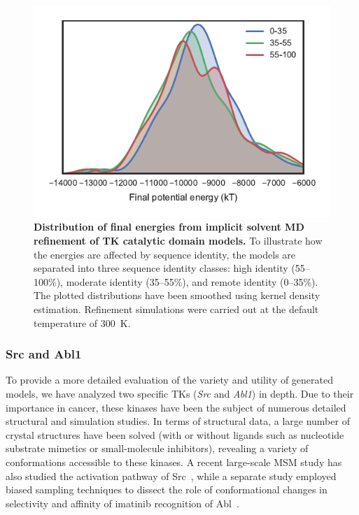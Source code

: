 \documentclass[aps,pre,twocolumn,nofootinbib,superscriptaddress,linenumbers]{revtex4-1}
\begin{document}
\begin{figure}[tbp]
    \includegraphics[width=1.0\columnwidth]{energies/energies.pdf}

    \caption{{\bf Distribution of final energies from implicit solvent MD refinement of TK catalytic domain models.}
    To illustrate how the energies are affected by sequence identity, the models are separated into three sequence identity classes: high identity (55--100\%), moderate identity (35--55\%), and remote identity (0--35\%).
    The plotted distributions have been smoothed using kernel density estimation.
    Refinement simulations were carried out at the default temperature of 300~K.
  }
  \label{figure:energies-implicit}
\end{figure}


\subsubsection*{Src and Abl1}

\color{red}
To provide a more detailed evaluation of the variety and utility of generated models, we have analyzed two specific TKs (\emph{Src} and \emph{Abl1}) in depth.
Due to their importance in cancer, these kinases have been the subject of numerous detailed structural and simulation studies.
In terms of structural data, a large number of crystal structures have been solved (with or without ligands such as nucleotide substrate mimetics or small-molecule inhibitors), revealing a variety of conformations accessible to these kinases.
A recent large-scale MSM study has also studied the activation pathway of Src~\cite{shukla-pande:nature-commun:2014:src-activation-msm}, while a separate study employed biased sampling techniques to dissect the role of conformational changes in selectivity and affinity of imatinib recognition of Abl~\cite{roux:pnas:2013:abl-imatinib}.
\color{black}
\end{document}

